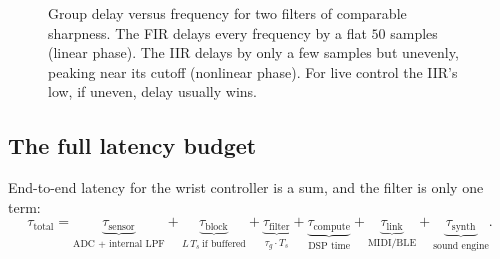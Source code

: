 \begin{figure}[H]
\centering
{}
\caption{Group delay versus frequency for two filters of comparable sharpness.
The FIR delays every frequency by a flat $50$ samples (linear phase). The IIR
delays by only a few samples but unevenly, peaking near its cutoff (nonlinear
phase). For live control the IIR's low, if uneven, delay usually wins.}
\label{ch17:fig-groupdelay}
\end{figure}

\subsection{The full latency budget}

End-to-end latency for the wrist controller is a sum, and the filter is only one
term:
\begin{equation}
  \tau_{\text{total}} =
    \underbrace{\tau_{\text{sensor}}}_{\text{ADC + internal LPF}}
    + \underbrace{\tau_{\text{block}}}_{L\,T_s\ \text{if buffered}}
    + \underbrace{\tau_{\text{filter}}}_{\tau_g \cdot T_s}
    + \underbrace{\tau_{\text{compute}}}_{\text{DSP time}}
    + \underbrace{\tau_{\text{link}}}_{\text{MIDI/BLE}}
    + \underbrace{\tau_{\text{synth}}}_{\text{sound engine}}.
  \label{ch17:budget}
\end{equation}

